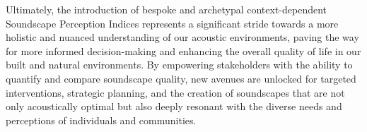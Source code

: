 \documentclass[
  authoryear,
  preprint,
  3p]{elsarticle}
\begin{document}
Ultimately, the introduction of bespoke and archetypal context-dependent
Soundscape Perception Indices represents a significant stride towards a
more holistic and nuanced understanding of our acoustic environments,
paving the way for more informed decision-making and enhancing the
overall quality of life in our built and natural environments. By
empowering stakeholders with the ability to quantify and compare
soundscape quality, new avenues are unlocked for targeted interventions,
strategic planning, and the creation of soundscapes that are not only
acoustically optimal but also deeply resonant with the diverse needs and
perceptions of individuals and communities.


  
\end{document}
